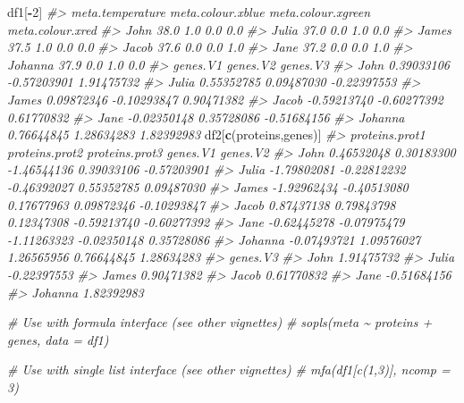 \documentclass[
]{article}
\newenvironment{Shaded}{\begin{snugshade}}{\end{snugshade}}
\newcommand{\CommentTok}[1]{\textcolor[rgb]{0.56,0.35,0.01}{\textit{#1}}}
\newcommand{\DecValTok}[1]{\textcolor[rgb]{0.00,0.00,0.81}{#1}}
\newcommand{\FunctionTok}[1]{\textcolor[rgb]{0.13,0.29,0.53}{\textbf{#1}}}
\newcommand{\NormalTok}[1]{#1}
\newcommand{\SpecialCharTok}[1]{\textcolor[rgb]{0.81,0.36,0.00}{\textbf{#1}}}
\newcommand{\StringTok}[1]{\textcolor[rgb]{0.31,0.60,0.02}{#1}}
\begin{document}
\begin{Shaded}
\begin{Highlighting}[]
\NormalTok{df1[}\SpecialCharTok{{-}}\DecValTok{2}\NormalTok{]}
\CommentTok{\#\textgreater{}         meta.temperature meta.colour.xblue meta.colour.xgreen meta.colour.xred}
\CommentTok{\#\textgreater{} John                38.0               1.0                0.0              0.0}
\CommentTok{\#\textgreater{} Julia               37.0               0.0                1.0              0.0}
\CommentTok{\#\textgreater{} James               37.5               1.0                0.0              0.0}
\CommentTok{\#\textgreater{} Jacob               37.6               0.0                0.0              1.0}
\CommentTok{\#\textgreater{} Jane                37.2               0.0                0.0              1.0}
\CommentTok{\#\textgreater{} Johanna             37.9               0.0                1.0              0.0}
\CommentTok{\#\textgreater{}            genes.V1    genes.V2    genes.V3}
\CommentTok{\#\textgreater{} John     0.39033106 {-}0.57203901  1.91475732}
\CommentTok{\#\textgreater{} Julia    0.55352785  0.09487030 {-}0.22397553}
\CommentTok{\#\textgreater{} James    0.09872346 {-}0.10293847  0.90471382}
\CommentTok{\#\textgreater{} Jacob   {-}0.59213740 {-}0.60277392  0.61770832}
\CommentTok{\#\textgreater{} Jane    {-}0.02350148  0.35728086 {-}0.51684156}
\CommentTok{\#\textgreater{} Johanna  0.76644845  1.28634283  1.82392983}
\NormalTok{df2[}\FunctionTok{c}\NormalTok{(}\StringTok{\textquotesingle{}proteins\textquotesingle{}}\NormalTok{,}\StringTok{\textquotesingle{}genes\textquotesingle{}}\NormalTok{)]}
\CommentTok{\#\textgreater{}         proteins.prot1 proteins.prot2 proteins.prot3    genes.V1    genes.V2}
\CommentTok{\#\textgreater{} John        0.46532048     0.30183300    {-}1.46544136  0.39033106 {-}0.57203901}
\CommentTok{\#\textgreater{} Julia      {-}1.79802081    {-}0.22812232    {-}0.46392027  0.55352785  0.09487030}
\CommentTok{\#\textgreater{} James      {-}1.92962434    {-}0.40513080     0.17677963  0.09872346 {-}0.10293847}
\CommentTok{\#\textgreater{} Jacob       0.87437138     0.79843798     0.12347308 {-}0.59213740 {-}0.60277392}
\CommentTok{\#\textgreater{} Jane       {-}0.62445278    {-}0.07975479    {-}1.11263323 {-}0.02350148  0.35728086}
\CommentTok{\#\textgreater{} Johanna    {-}0.07493721     1.09576027     1.26565956  0.76644845  1.28634283}
\CommentTok{\#\textgreater{}            genes.V3}
\CommentTok{\#\textgreater{} John     1.91475732}
\CommentTok{\#\textgreater{} Julia   {-}0.22397553}
\CommentTok{\#\textgreater{} James    0.90471382}
\CommentTok{\#\textgreater{} Jacob    0.61770832}
\CommentTok{\#\textgreater{} Jane    {-}0.51684156}
\CommentTok{\#\textgreater{} Johanna  1.82392983}

\CommentTok{\# Use with formula interface (see other vignettes)}
\CommentTok{\# sopls(meta \textasciitilde{} proteins + genes, data = df1)}

\CommentTok{\# Use with single list interface (see other vignettes)}
\CommentTok{\# mfa(df1[c(1,3)], ncomp = 3)}
\end{Highlighting}
\end{Shaded}
\end{document}
